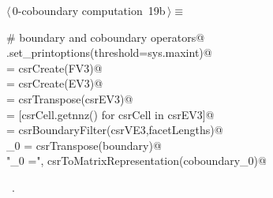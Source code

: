 \documentclass[11pt,oneside]{article}	%
\begin{document}
\begin{flushleft} \small
\begin{minipage}{\linewidth} \label{scrap40}
\protect{}$\langle\,$0-coboundary computation\nobreak\ {\footnotesize 19b}$\,\rangle\equiv$
\vspace{-1ex}
\begin{list}{}{} \item
\mbox{}\verb@# boundary and coboundary operators@\\
\mbox{}\verb@np.set_printoptions(threshold=sys.maxint)@\\
\mbox{} = csrCreate(FV3)@\\
\mbox{} = csrCreate(EV3)@\\
\mbox{} = csrTranspose(csrEV3)@\\
\mbox{}\verb@facetLengths = [csrCell.getnnz() for csrCell in csrEV3]@\\
\mbox{}\verb@boundary = csrBoundaryFilter(csrVE3,facetLengths)@\\
\mbox{}\verb@coboundary_0 = csrTranspose(boundary)@\\
\mbox{}\verb@print "\ncoboundary_0 =\n", csrToMatrixRepresentation(coboundary_0)@\\
\mbox{}\verb@@{\NWsep}
\end{list}
\vspace{-1ex}
\footnotesize\addtolength{\baselineskip}{-1ex}
\begin{list}{}{\setlength{\itemsep}{-\parsep}\setlength{\itemindent}{-\leftmargin}}
\item \NWtxtMacroRefIn\ .
\end{list}
\end{minipage}\\[4ex]
\end{flushleft}
\end{document}
